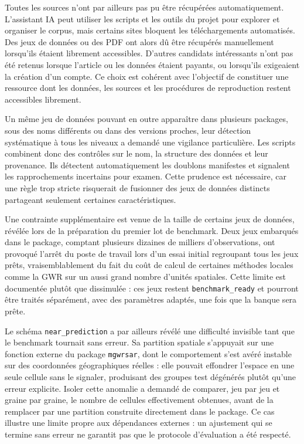 \documentclass[11pt,a4paper]{article}
\begin{document}
Toutes les sources n'ont par ailleurs pas pu être récupérées automatiquement. L'assistant IA peut utiliser les scripts et les outils du projet pour explorer et organiser le corpus, mais certains sites bloquent les téléchargements automatisés. Des jeux de données ou des PDF ont alors dû être récupérés manuellement lorsqu'ils étaient librement accessibles. D'autres candidats intéressants n'ont pas été retenus lorsque l'article ou les données étaient payants, ou lorsqu'ils exigeaient la création d'un compte. Ce choix est cohérent avec l'objectif de constituer une ressource dont les données, les sources et les procédures de reproduction restent accessibles librement.

Un même jeu de données pouvant en outre apparaître dans plusieurs packages, sous des noms différents ou dans des versions proches, leur détection systématique à tous les niveaux a demandé une vigilance particulière. Les scripts combinent donc des contrôles sur le nom, la structure des données et leur provenance. Ils détectent automatiquement les doublons manifestes et signalent les rapprochements incertains pour examen. Cette prudence est nécessaire, car une règle trop stricte risquerait de fusionner des jeux de données distincts partageant seulement certaines caractéristiques.

Une contrainte supplémentaire est venue de la taille de certains jeux de données, révélée lors de la préparation du premier lot de benchmark. Deux jeux embarqués dans le package, comptant plusieurs dizaines de milliers d'observations, ont provoqué l'arrêt du poste de travail lors d'un essai initial regroupant tous les jeux prêts, vraisemblablement du fait du coût de calcul de certaines méthodes locales comme la GWR sur un aussi grand nombre d'unités spatiales. Cette limite est documentée plutôt que dissimulée : ces jeux restent \texttt{benchmark\_ready} et pourront être traités séparément, avec des paramètres adaptés, une fois que la banque sera prête.

Le schéma \texttt{near\_prediction} a par ailleurs révélé une difficulté invisible tant que le benchmark tournait sans erreur. Sa partition spatiale s'appuyait sur une fonction externe du package \texttt{mgwrsar}, dont le comportement s'est avéré instable sur des coordonnées géographiques réelles : elle pouvait effondrer l'espace en une seule cellule sans le signaler, produisant des groupes test dégénérés plutôt qu'une erreur explicite. Isoler cette anomalie a demandé de comparer, jeu par jeu et graine par graine, le nombre de cellules effectivement obtenues, avant de la remplacer par une partition construite directement dans le package. Ce cas illustre une limite propre aux dépendances externes : un ajustement qui se termine sans erreur ne garantit pas que le protocole d'évaluation a été respecté.
\end{document}
